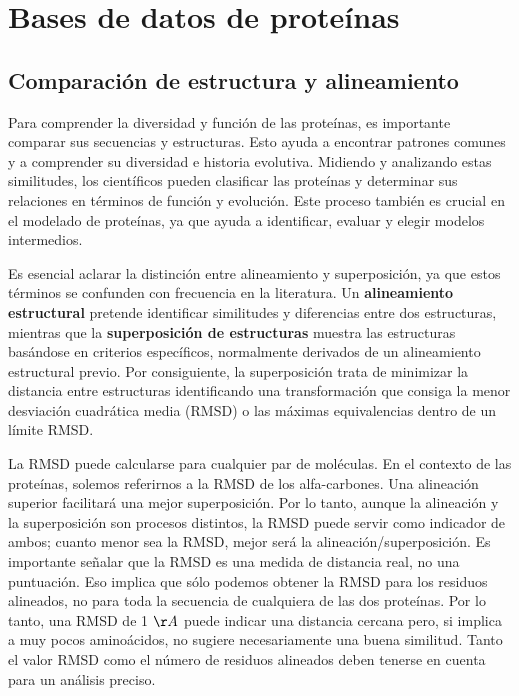 \chapter{Bases de datos de proteínas}
\section{Comparación de estructura y alineamiento}
Para comprender la diversidad y función de las proteínas, es importante comparar sus secuencias y estructuras. Esto ayuda a encontrar patrones comunes y a comprender su diversidad e historia evolutiva. Midiendo y analizando estas similitudes, los científicos pueden clasificar las proteínas y determinar sus relaciones en términos de función y evolución. Este proceso también es crucial en el modelado de proteínas, ya que ayuda a identificar, evaluar y elegir modelos intermedios.

Es esencial aclarar la distinción entre alineamiento y superposición, ya que estos términos se confunden con frecuencia en la literatura. Un \textbf{alineamiento estructural} pretende identificar similitudes y diferencias entre dos estructuras, mientras que la \textbf{superposición de estructuras} muestra las estructuras basándose en criterios específicos, normalmente derivados de un alineamiento estructural previo. Por consiguiente, la superposición trata de minimizar la distancia entre estructuras identificando una transformación que consiga la menor desviación cuadrática media (RMSD) o las máximas equivalencias dentro de un límite RMSD.

La RMSD puede calcularse para cualquier par de moléculas. En el contexto de las proteínas, solemos referirnos a la RMSD de los alfa-carbones. Una alineación superior facilitará una mejor superposición. Por lo tanto, aunque la alineación y la superposición son procesos distintos, la RMSD puede servir como indicador de ambos; cuanto menor sea la RMSD, mejor será la alineación/superposición. Es importante señalar que la RMSD es una medida de distancia real, no una puntuación. Eso implica que sólo podemos obtener la RMSD para los residuos alineados, no para toda la secuencia de cualquiera de las dos proteínas. Por lo tanto, una RMSD de 1 $\AA$ puede indicar una distancia cercana pero, si implica a muy pocos aminoácidos, no sugiere necesariamente una buena similitud. Tanto el valor RMSD como el número de residuos alineados deben tenerse en cuenta para un análisis preciso.

